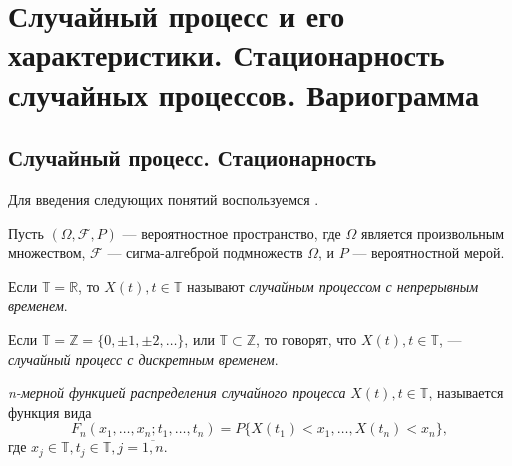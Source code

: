 \newpage
\chapter{Случайный процесс и его характеристики. Стационарность случайных процессов. Вариограмма}
\label{c:definitions}

\section{Случайный процесс. Стационарность}

Для введения следующих понятий воспользуемся \cite{brillinjer-ts, trush-ts}.

Пусть $ (\Omega, \mathcal{F}, P) $ --- вероятностное пространство, где $\Omega$ является произвольным множеством, $\mathcal{F}$ --- сигма-алгеброй подмножеств $\Omega$, и $P$ --- вероятностной мерой.


\begin{Definition}
    Если $  =  $, то $ X(t), t \in {} $ называют \textit{случайным процессом с непрерывным временем}.
\end{Definition}

\begin{Definition}
	Если $  =  = \{ 0, , , \dots \} $, или $  \subset {} $, то говорят, что $ X(t), t \in {} $, --- \textit{случайный процесс с дискретным временем}.
\end{Definition}

\begin{Definition}
\label{def:distr_func}
	\textit{n-мерной функцией распределения случайного процесса} $ X(t), t \in {} $, называется функция вида
	\begin{equation*}
		F_n(x_1, \dots, x_n; t_1, \dots, t_n) = P \{ X(t_1) < x_1, \dots, X(t_n) < x_n \},
	\end{equation*}
	где $ x_j \in {}, t_j \in {}, j =  $.
\end{Definition}

